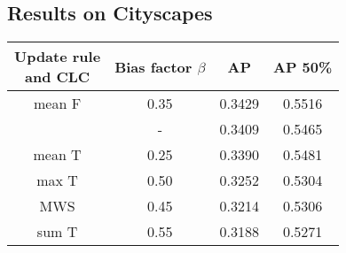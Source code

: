 \subsection{Results on Cityscapes}

\begin{table}
    \centering
    \begin{subtable}[t!]{0.5\textwidth}\centering
        \begin{tabular}{c| c| c | c }
        \makecell{Update rule \\ and CLC} & \makecell{Bias \\factor $\beta$} & AP & AP 50\%\\ \midrule\midrule
mean F & 0.35  & {\color{ForestGreen} 0.3429 } & {\color{ForestGreen} 0.5516 } \\
\cite{liu2018affinity} & -  & {\color{ForestGreen} 0.3409 } & {\color{ForestGreen} 0.5465 } \\
mean T & 0.25  & {\color{Orange} 0.3390 } & {\color{ForestGreen} 0.5481 } \\
max T & 0.50  & {\color{Orange} 0.3252 } & {\color{ForestGreen} 0.5304 } \\
MWS & 0.45  & {\color{Orange} 0.3214 } & {\color{ForestGreen} 0.5306 } \\
sum T & 0.55  & {\color{Orange} 0.3188 } & {\color{Orange} 0.5271 } \\

\end{tabular}
\end{subtable}
\end{table}
